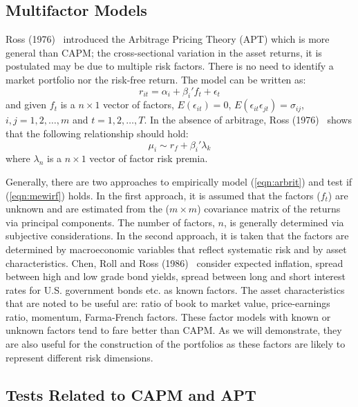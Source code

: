 \subsection{Multifactor Models}


Ross (1976)~\cite{rossarb} introduced the Arbitrage Pricing Theory (APT) which is more general than CAPM; the cross-sectional variation in the asset returns, it is postulated may be due to multiple risk factors. There is no need to identify a market portfolio nor the risk-free return. The model can be written as:
	\begin{equation}\label{eqn:arbrit}
	r_{it} = \alpha_i + \beta_i' f_t + \epsilon_t
	\end{equation}
and given $f_t$ is a $n \times 1$ vector of factors, $E(\epsilon_{it})=0$, $E(\epsilon_{it}\epsilon_{jt})=\sigma_{ij}$, $i,j =1,2,\ldots,m$ and $t=1,2,\ldots, T$. In the absence of arbitrage, Ross (1976)~\cite{rossarb} shows that the following relationship should hold:
	\begin{equation}\label{eqn:mewirf}
	\mu_i \sim r_f + \beta_i' \lambda_k
	\end{equation}
where $\lambda_n$ is a $n \times 1$ vector of factor risk premia.


Generally, there are two approaches to empirically model (\ref{eqn:arbrit}) and test if (\ref{eqn:mewirf}) holds. In the first approach, it is assumed that the factors ($f_t$) are unknown and are estimated from the ($m \times m$) covariance matrix of the returns via principal components. The number of factors, $n$, is generally determined via subjective considerations. In the second approach, it is taken that the factors are determined by macroeconomic variables that reflect systematic risk and by asset characteristics. Chen, Roll and Ross (1986)~\cite{chenecforce} consider expected inflation, spread between high and low grade bond yields, spread between long and short interest rates for U.S. government bonds etc. as known factors. The asset characteristics that are noted to be useful are: ratio of book to market value, price-earnings ratio, momentum, Farma-French factors. These factor models with known or unknown factors tend to fare better than CAPM. As we will demonstrate, they are also useful for the construction of the portfolios as these factors are likely to represent different risk dimensions. 

	
\subsection{Tests Related to CAPM and APT}


